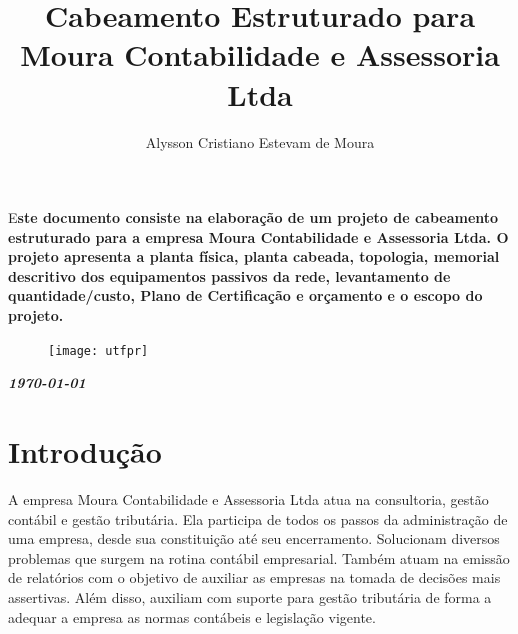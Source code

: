 \documentclass[	DIV=calc,%
							paper=a4,%
							fontsize=12pt,%
							onecolumn]{scrartcl}	 					%
\title{Cabeamento Estruturado para Moura Contabilidade e Assessoria Ltda }					%
\author{Alysson Cristiano Estevam de Moura }  	%
\date{}																				%
\newcommand{\initial}[1]{%
     \lettrine[lines=3,lhang=0.3,nindent=0em]{
     				\color{DarkGoldenrod}
     				{\textsf{#1}}}{}}
\begin{document}
\maketitle
\thispagestyle{fancy} 	
\thispagestyle{empty}		%





\initial{E}\textbf{ste documento consiste na elaboração de um projeto de cabeamento estruturado para a empresa Moura Contabilidade e Assessoria Ltda. O projeto apresenta a planta física, planta cabeada, topologia, memorial descritivo dos equipamentos passivos da rede, levantamento de quantidade/custo, Plano de Certificação e orçamento e o escopo do projeto.}


\begin{figure}
	\centering
	\texttt{[image: utfpr]}
\end{figure}

\vspace{2cm}
\centerline{\textit{\textbf{\today}}}

\clearpage
    \renewcommand*\listfigurename{Lista de figuras}
\listoffigures

\renewcommand*\listtablename{Lista de tabelas}
\listoftables




\clearpage
\renewcommand{\contentsname}{Sumário}
\tableofcontents
\clearpage

\section{Introdução}

A empresa Moura Contabilidade e Assessoria Ltda atua na consultoria, gestão contábil e gestão tributária. Ela participa de todos os passos da administração de uma empresa, desde sua constituição até seu encerramento. Solucionam diversos problemas que surgem na rotina contábil empresarial. Também atuam na emissão de relatórios com o objetivo de auxiliar as empresas na tomada de decisões mais assertivas. Além disso, auxiliam com suporte para gestão tributária de forma a adequar a empresa as normas contábeis e legislação vigente.
\end{document}
